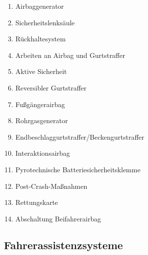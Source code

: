 \begin{enumerate}
\item
  Airbaggenerator\\
\item
  Sicherheitslenksäule\\
\item
  Rückhaltesystem\\
\item
  Arbeiten an Airbag und Gurtstraffer\\
\item
  Aktive Sicherheit\\
\item
  Reversibler Gurtstraffer\\
\item
  Fußgängerairbag\\
\item
  Rohrgasgenerator\\
\item
  Endbeschlaggurtstraffer/Beckengurtstraffer\\
\item
  Interaktionsairbag\\
\item
  Pyrotechnische Batteriesicherheitsklemme\\
\item
  Post-Crash-Maßnahmen\\
\item
  Rettungskarte\\
\item
  Abschaltung Beifahrerairbag
\end{enumerate}

\subsection{Fahrerassistenzsysteme}\label{fahrerassistenzsysteme}

